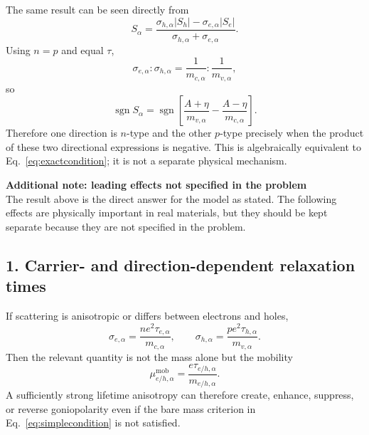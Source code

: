 \documentclass[11pt]{article}
\begin{document}
The same result can be seen directly from
\begin{equation}
S_\alpha=
\frac{\sigma_{h,\alpha}|S_h|-\sigma_{e,\alpha}|S_e|}
     {\sigma_{h,\alpha}+\sigma_{e,\alpha}}.
\end{equation}
Using $n=p$ and equal $\tau$,
\begin{equation}
\sigma_{e,\alpha}:\sigma_{h,\alpha}
=\frac{1}{m_{c,\alpha}}:\frac{1}{m_{v,\alpha}},
\end{equation}
so
\begin{equation}
\operatorname{sgn}S_\alpha
=
\operatorname{sgn}\!\left[
\frac{A+\eta}{m_{v,\alpha}}
-
\frac{A-\eta}{m_{c,\alpha}}
\right].
\end{equation}
Therefore one direction is $n$-type and the other $p$-type precisely when the product of these two directional expressions is negative. This is algebraically equivalent to Eq.~\eqref{eq:exactcondition}; it is not a separate physical mechanism.

\newpage
\textbf{Additional note: leading effects not specified in the problem}\\

The result above is the direct answer for the model as stated. The following effects are physically important in real materials, but they should be kept separate because they are not specified in the problem.

\subsection*{1. Carrier- and direction-dependent relaxation times}

If scattering is anisotropic or differs between electrons and holes,
\begin{equation}
\sigma_{e,\alpha}=\frac{ne^2\tau_{e,\alpha}}{m_{c,\alpha}},
\qquad
\sigma_{h,\alpha}=\frac{pe^2\tau_{h,\alpha}}{m_{v,\alpha}}.
\end{equation}
Then the relevant quantity is not the mass alone but the mobility
\begin{equation}
\mu^{\mathrm{mob}}_{e/h,\alpha}
=\frac{e\tau_{e/h,\alpha}}{m_{e/h,\alpha}}.
\end{equation}
A sufficiently strong lifetime anisotropy can therefore create, enhance, suppress, or reverse goniopolarity even if the bare mass criterion in Eq.~\eqref{eq:simplecondition} is not satisfied.
\end{document}
